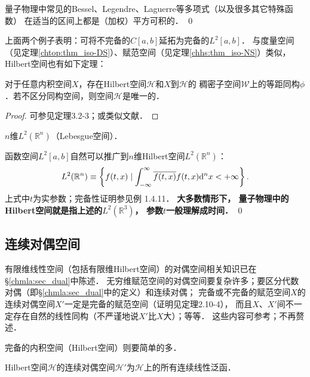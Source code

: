 量子物理中常见的Bessel、Legendre、Laguerre等多项式（以及很多其它特殊函数）
在适当的区间上都是（加权）平方可积的．
\qed

上面两个例子表明：可将不完备的$C[a,b]$延拓为完备的$L^2[a,b]$．
与度量空间（见定理\ref{chtop:thm_iso-DS}）、赋范空间（见定理\ref{chhs:thm_iso-NS}）类似，
Hilbert空间也有如下定理：

\begin{theorem}\label{chhs:thm_iso-hs}
	对于任意内积空间$X$，存在Hilbert空间$\mathcal{H}$和$X$到$\mathcal{H}$的
	稠密子空间$\mathcal{W}$上的等距同构$\phi$．若不区分同构空间，则空间$\mathcal{H}$是唯一的．
\end{theorem}
\begin{proof}
	可参见\parencite{Kreyszig-1991}定理3.2-3；或类似文献．
\end{proof}


\begin{example}
	$n$维$L^2(\mathbb{R}^n)$（Lebesgue空间）．
\end{example}
函数空间$L^2[a,b]$自然可以推广到$n$维Hilbert空间$L^2(\mathbb{R}^n)$：
\begin{equation}
	L^2(\mathbb{R}^n) \equiv \left\{f(t,{x}) \mid \int_{-\infty}^{\infty} 
	\overline{f(t,{x})} f(t,{x}) {\rm d}^n x  < +\infty \right\}.
\end{equation}
上式中$t$为实参数；{\kaishu 完备性证明参见\parencite{zhang-lin-2021}例 1.4.11}．
{\heiti \bfseries 大多数情形下，
	量子物理中的Hilbert空间就是指上述的$L^2(\mathbb{R}^3)$，
	参数$t$一般理解成时间．}
\qed


\subsection{连续对偶空间}\label{chhs:sec_dual}

有限维线性空间（包括有限维Hilbert空间）的对偶空间相关知识已在\S\ref{chmla:sec_dual}中陈述．
无穷维赋范空间的对偶空间要复杂许多；要区分代数对偶（即\S\ref{chmla:sec_dual}中的定义）和连续对偶；
完备或不完备的赋范空间$X$的连续对偶空间$X'$一定是完备的赋范空间（证明见\parencite{Kreyszig-1991}定理2.10-4），
而且$X$、$X'$间不一定存在自然的线性同构（不严谨地说$X'$比$X$大）；等等．
这些内容可参考\parencite{Kreyszig-1991}；不再赘述．

完备的内积空间（Hilbert空间）则要简单的多．


\begin{definition}\label{chhs:def_bld}
	Hilbert空间$\mathcal{H}$的连续对偶空间$\mathcal{H}'$为$\mathcal{H}$上的所有连续线性泛函．
\end{definition}

